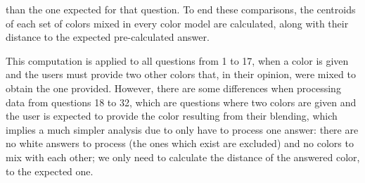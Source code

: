 than the one expected for that question. To end these comparisons, the centroids of each set of colors mixed in every color model are calculated, along with their distance to the expected
pre-calculated answer. \par
%
This computation is applied to all questions from 1 to 17, when a color is given and the users must provide two other colors that, in their opinion, were mixed to obtain the one provided.
However, there are some differences when processing data from questions 18 to 32, which are questions where two colors are given and the user is expected to provide the color resulting from their blending, which
implies a much simpler analysis due to only have to process one answer: there are no white answers to process (the ones which exist are excluded) and no colors to mix with each other; we only need to calculate
the distance of the answered color, to the expected one.
%
